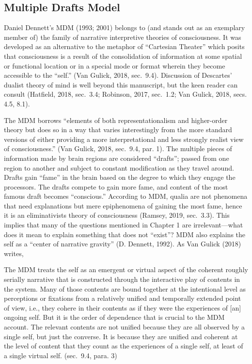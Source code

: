 \documentclass[12pt,twoside]{reedthesis}
\begin{document}
\hypertarget{multiple-drafts-model}{%
\subsection{Multiple Drafts Model}\label{multiple-drafts-model}}

Daniel Dennett's MDM (1993; 2001) belongs to (and stands out as an exemplary member of) the family of narrative interpretive theories of consciousness. It was developed as an alternative to the metaphor of ``Cartesian Theater'' which posits that consciousness is a result of the consolidation of information at some spatial or functional location or in a special mode or format wherein they become accessible to the ``self.'' (Van Gulick, 2018, sec.~9.4). Discussion of Descartes' dualist theory of mind is well beyond this manuscript, but the keen reader can consult (Hatfield, 2018, sec.~3.4; Robinson, 2017, sec.~1.2; Van Gulick, 2018, secs. 4.5, 8.1).

The MDM borrows ``elements of both representationalism and higher-order theory but does so in a way that varies interestingly from the more standard versions of either providing a more interpretational and less strongly realist view of consciousness.'' (Van Gulick, 2018, sec.~9.4, par. 1). The multiple pieces of information made by brain regions are considered ``drafts''; passed from one region to another and subject to constant modification as they travel around. Drafts gain ``fame'' in the brain based on the degree to which they engage the processors. The drafts compete to gain more fame, and content of the most famous draft becomes ``conscious.'' According to MDM, qualia are not phenomena that need explanations but mere epiphenomena of gaining the most fame, hence it is an eliminativists theory of consciousness (Ramsey, 2019, sec.~3.3). This implies that many of the questions mentioned in Chapter 1 are irrelevant---what does it mean to explain something that does not ``exist''? MDM also explains the self as a ``center of narrative gravity'' (D. Dennett, 1992). As Van Gulick (2018) writes,

The MDM treats the self as an emergent or virtual aspect of the coherent roughly serially narrative that is constructed through the interactive play of contents in the system. Many of those contents are bound together at the intentional level as perceptions or fixations from a relatively unified and temporally extended point of view, i.e., they cohere in their contents as if they were the experiences of {[}an{]} ongoing self. But it is the order of dependence that is crucial to the MDM account. The relevant contents are not unified because they are all observed by a single self, but just the converse. It is because they are unified and coherent at the level of content that they count as the experiences of a single self, at least of a single virtual self. (sec.~9.4, para. 3)
\end{document}
